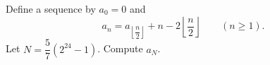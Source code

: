 Define a sequence by $a_0=0$ and
\[
a_n=a_{\left\lfloor\dfrac {n}{2}\right\rfloor}+n-2\left\lfloor\dfrac {n}{2}\right\rfloor\qquad(n\ge1).
\]
Let $N=\dfrac{5}{7}\left(2^{24}-1\right)$. Compute $a_N$.
